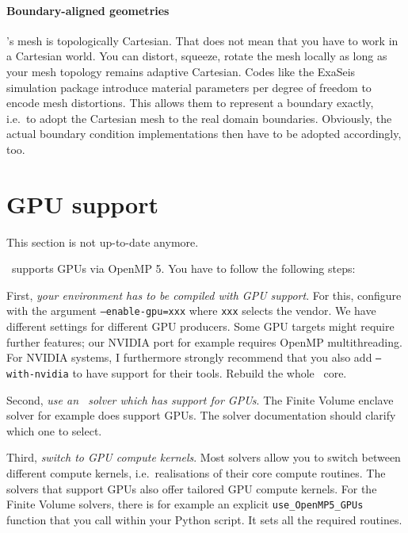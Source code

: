 \paragraph{Boundary-aligned geometries}

\ExaHyPE's mesh is topologically Cartesian.
That does not mean that you have to work in a Cartesian world.
You can distort, squeeze, rotate the mesh locally as long as your mesh topology
remains adaptive Cartesian.
Codes like the ExaSeis simulation package introduce material parameters per
degree of freedom to encode mesh distortions.
This allows them to represent a boundary exactly, i.e.~to adopt the Cartesian
mesh to the real domain boundaries.
Obviously, the actual boundary condition implementations then have to be adopted
accordingly, too.


\section{GPU support}


\begin{remark}
 This section is not up-to-date anymore.
\end{remark}


\ExaHyPE\ supports GPUs via OpenMP 5.
You have to follow the following steps:


First, \emph{your environment has to be compiled with GPU support}.
For this, configure with the argument \texttt{--enable-gpu=xxx} where
\texttt{xxx} selects the vendor.
We have different settings for different GPU producers.
Some GPU targets might require further features; our NVIDIA port for example
requires OpenMP multithreading.
For NVIDIA systems, I furthermore strongly
recommend that you also add \texttt{--with-nvidia} to have support for their tools.
Rebuild the whole \Peano\ core.


Second, \emph{use an \ExaHyPE\ solver which has support for GPUs}. 
The Finite Volume enclave solver for example does support GPUs. 
The solver documentation should clarify which one to select.


Third, \emph{switch to GPU compute kernels}.
Most solvers allow you to switch between different compute kernels,
i.e.~realisations of their core compute routines.
The solvers that support GPUs also offer tailored GPU compute kernels.
For the Finite Volume solvers, there is for example an explicit
\texttt{use\_OpenMP5\_GPUs} function that you call within your Python
script.
It sets all the required routines.



